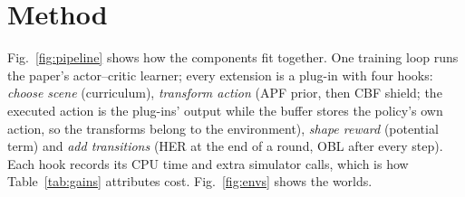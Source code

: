 \documentclass[conference]{IEEEtran}
\begin{document}
\section{Method}\label{sec:method}
Fig.~\ref{fig:pipeline} shows how the components fit together. One training loop runs the paper's actor--critic learner; every extension is a plug-in with four hooks: \emph{choose scene} (curriculum), \emph{transform action} (APF prior, then CBF shield; the executed action is the plug-ins' output while the buffer stores the policy's own action, so the transforms belong to the environment), \emph{shape reward} (potential term) and \emph{add transitions} (HER at the end of a round, OBL after every step). Each hook records its CPU time and extra simulator calls, which is how Table~\ref{tab:gains} attributes cost. Fig.~\ref{fig:envs} shows the worlds.
\end{document}
